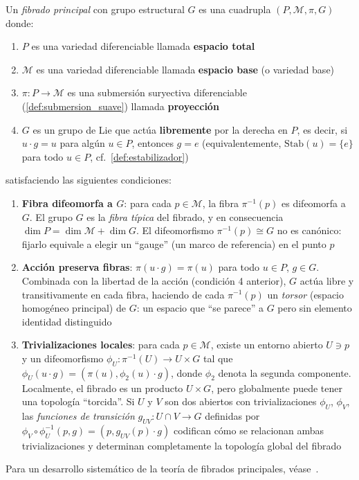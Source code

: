 \begin{definition}\label{def:fibrado_principal_formal}
Un \textit{fibrado principal} con grupo estructural $G$ es una cuadrupla $(P, \mathcal{M}, \pi, G)$ donde:
\begin{enumerate}
    \item $P$ es una variedad diferenciable llamada \textbf{espacio total}
    \item $\mathcal{M}$ es una variedad diferenciable llamada \textbf{espacio base} (o variedad base)
    \item $\pi: P \to \mathcal{M}$ es una submersión suryectiva diferenciable (\autoref{def:submersion_suave}) llamada \textbf{proyección}
    \item $G$ es un grupo de Lie que actúa \textbf{libremente} por la derecha en $P$, es decir, si $u \cdot g = u$ para algún $u \in P$, entonces $g = e$ (equivalentemente, $\mathrm{Stab}(u) = \{e\}$ para todo $u \in P$, cf.\ \autoref{def:estabilizador})
\end{enumerate}
satisfaciendo las siguientes condiciones:
\begin{enumerate}
    \item[(a)] \textbf{Fibra difeomorfa a $G$}: para cada $p \in \mathcal{M}$, la fibra $\pi^{-1}(p)$ es difeomorfa a $G$. El grupo $G$ es la \textit{fibra típica} del fibrado, y en consecuencia $\dim P = \dim \mathcal{M} + \dim G$. El difeomorfismo $\pi^{-1}(p) \cong G$ no es canónico: fijarlo equivale a elegir un ``gauge'' (un marco de referencia) en el punto $p$

    \item[(b)] \textbf{Acción preserva fibras}: $\pi(u \cdot g) = \pi(u)$ para todo $u \in P$, $g \in G$. Combinada con la libertad de la acción (condición 4 anterior), $G$ actúa libre y transitivamente en cada fibra, haciendo de cada $\pi^{-1}(p)$ un \textit{torsor} (espacio homogéneo principal) de $G$: un espacio que ``se parece'' a $G$ pero sin elemento identidad distinguido

    \item[(c)] \textbf{Trivializaciones locales}: para cada $p \in \mathcal{M}$, existe un entorno abierto $U \ni p$ y un difeomorfismo $\phi_U: \pi^{-1}(U) \to U \times G$ tal que $\phi_U(u \cdot g) = (\pi(u), \phi_2(u) \cdot g)$, donde $\phi_2$ denota la segunda componente. Localmente, el fibrado es un producto $U \times G$, pero globalmente puede tener una topología ``torcida''. Si $U$ y $V$ son dos abiertos con trivializaciones $\phi_U$, $\phi_V$, las \textit{funciones de transición} $g_{UV}: U \cap V \to G$ definidas por $\phi_V \circ \phi_U^{-1}(p, g) = (p, g_{UV}(p) \cdot g)$ codifican cómo se relacionan ambas trivializaciones y determinan completamente la topología global del fibrado
\end{enumerate}
Para un desarrollo sistemático de la teoría de fibrados principales, véase~\citep{Kobayashi1996}.
\end{definition}

